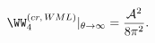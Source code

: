 \begin{equation}
\label{finres}
\WW_{4}^{(cr, \, WML)}|_{\theta \to \infty} = {{{\cal A}^2 }\over {8 {\pi }^2 }}.
\end{equation}

